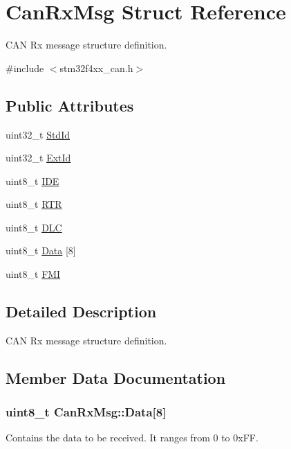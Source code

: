 \hypertarget{struct_can_rx_msg}{}\section{Can\+Rx\+Msg Struct Reference}
\label{struct_can_rx_msg}


C\+A\+N Rx message structure definition.  




{\ttfamily \#include $<$stm32f4xx\+\_\+can.\+h$>$}

\subsection*{Public Attributes}
\begin{DoxyCompactItemize}
\item 
uint32\+\_\+t \hyperlink{struct_can_rx_msg_a62769e18836146f71238bee6b43b531e}{Std\+Id}
\item 
uint32\+\_\+t \hyperlink{struct_can_rx_msg_a1fdca10d31c81eea2ccef41d2aced562}{Ext\+Id}
\item 
uint8\+\_\+t \hyperlink{struct_can_rx_msg_a83a67d1a709cc01570ce956e5adc811f}{I\+D\+E}
\item 
uint8\+\_\+t \hyperlink{struct_can_rx_msg_a9a183149a391a24f86da2ce895f0f1c9}{R\+T\+R}
\item 
uint8\+\_\+t \hyperlink{struct_can_rx_msg_abf77d3abf9ad290c08cdfd5d99ebc745}{D\+L\+C}
\item 
uint8\+\_\+t \hyperlink{struct_can_rx_msg_ae8ecbad16622db30d63fda08bc478649}{Data} \mbox{[}8\mbox{]}
\item 
uint8\+\_\+t \hyperlink{struct_can_rx_msg_a5afe39d8e295659eeb3030593828b96a}{F\+M\+I}
\end{DoxyCompactItemize}


\subsection{Detailed Description}
C\+A\+N Rx message structure definition. 

\subsection{Member Data Documentation}
\hypertarget{struct_can_rx_msg_ae8ecbad16622db30d63fda08bc478649}{}
\subsubsection[{Data}]{\setlength{\rightskip}{0pt plus 5cm}uint8\+\_\+t Can\+Rx\+Msg\+::\+Data\mbox{[}8\mbox{]}}\label{struct_can_rx_msg_ae8ecbad16622db30d63fda08bc478649}
Contains the data to be received. It ranges from 0 to 0x\+F\+F. \hypertarget{struct_can_rx_msg_abf77d3abf9ad290c08cdfd5d99ebc745}{}
